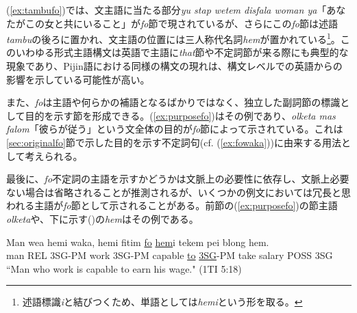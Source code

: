 (\ref{ex:tambufo})では、文主語に当たる部分\textit{yu stap wetem disfala woman ya}「あなたがこの女と共にいること」が\textit{fo}節で現されているが、さらにこの\textit{fo}節は述語\textit{tambu}の後ろに置かれ、文主語の位置には三人称代名詞\textit{hem}が置かれている\footnote{
述語標識\textit{i}と結びつくため、単語としては\textit{hemi}という形を取る。}。このいわゆる形式主語構文は英語で主語に\textit{that}節や不定詞節が来る際にも典型的な現象であり\citep[1049, 1391--1392]{english}、Pijin語における同様の構文の現れは、構文レベルでの英語からの影響を示している可能性が高い。

また、\textit{fo}は主語や何らかの補語となるばかりではなく、独立した副詞節の標識として目的を示す節を形成できる。(\ref{ex:purposefo})はその例であり、\textit{olketa mas falom}「彼らが従う」という文全体の目的が\textit{fo}節によって示されている。これは\ref{sec:originalfo}節で示した目的を示す不定詞句(cf. (\ref{ex:fowaka}))に由来する用法として考えられる。

最後に、\textit{fo}不定詞の主語を示すかどうかは文脈上の必要性に依存し、文脈上必要ない場合は省略されることが推測されるが、いくつかの例文においては冗長と思われる主語が\textit{fo}節として示されることがある。前節の(\ref{ex:purposefo})の節主語\textit{olketa}や、下に示す()の\textit{hem}はその例である。

\begin{exe}
  \ex
  \gll Man wea hemi waka, hemi fitim \underline{fo} \underline{hem}i tekem pei blong hem.\\
  man REL 3SG-PM work 3SG-PM capable \underline{to} \underline{3SG}-PM take salary POSS 3SG\\
  \glt ``Man who work is capable to earn his wage." (1TI 5:18)
\end{exe}
